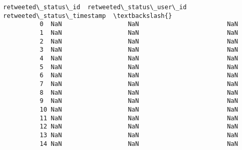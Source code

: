\documentclass[11pt]{article}
\begin{document}
\begin{Verbatim}[commandchars=\\\{\}]
              retweeted\_status\_id  retweeted\_status\_user\_id retweeted\_status\_timestamp  \textbackslash{}
          0  NaN                  NaN                        NaN                         
          1  NaN                  NaN                        NaN                         
          2  NaN                  NaN                        NaN                         
          3  NaN                  NaN                        NaN                         
          4  NaN                  NaN                        NaN                         
          5  NaN                  NaN                        NaN                         
          6  NaN                  NaN                        NaN                         
          7  NaN                  NaN                        NaN                         
          8  NaN                  NaN                        NaN                         
          9  NaN                  NaN                        NaN                         
          10 NaN                  NaN                        NaN                         
          11 NaN                  NaN                        NaN                         
          12 NaN                  NaN                        NaN                         
          13 NaN                  NaN                        NaN                         
          14 NaN                  NaN                        NaN                         
          

\end{Verbatim}
\end{document}
